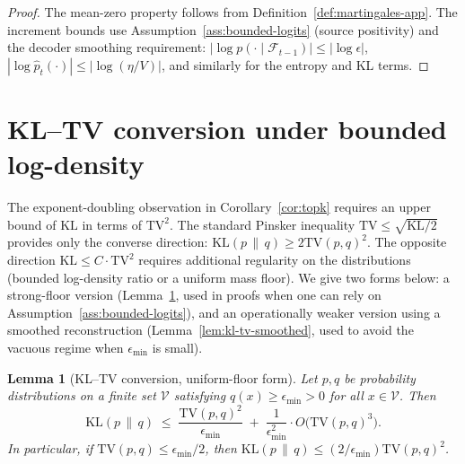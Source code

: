 \documentclass[11pt]{article}
\newcommand{\V}{\mathcal{V}}
\newcommand{\F}{\mathcal{F}}
\newcommand{\phat}{\hat{p}}
\newcommand{\KLs}{\mathrm{KL}}
\newcommand{\TV}{\mathrm{TV}}
\theoremstyle{plain}
\newtheorem{lemma}[theorem]{Lemma}
\theoremstyle{definition}
\theoremstyle{remark}
\begin{document}
\begin{proof}
The mean-zero property follows from Definition~\ref{def:martingales-app}.
The increment bounds use Assumption~\ref{ass:bounded-logits} (source
positivity) and the decoder smoothing requirement:
$|\log p(\cdot \mid \F_{t-1})| \leq |\log \epsilon|$,
$|\log \phat_t(\cdot)| \leq |\log(\eta/V)|$, and similarly for the
entropy and KL terms.
\end{proof}

\section{KL--TV conversion under bounded log-density}\label{app:kltv}

The exponent-doubling observation in Corollary~\ref{cor:topk}
requires an upper bound of $\KLs$ in terms of $\TV^2$. The standard
Pinsker inequality $\TV \leq \sqrt{\KLs/2}$ provides only the
converse direction: $\KLs(p\,\|\,q) \geq 2\TV(p,q)^2$. The opposite
direction $\KLs \leq C \cdot \TV^2$ requires additional regularity
on the distributions (bounded log-density ratio or a uniform mass
floor). We give two forms below: a strong-floor version
(Lemma~\ref{lem:kl-tv-bounded}, used in proofs when one can rely
on Assumption~\ref{ass:bounded-logits}), and an operationally
weaker version using a smoothed reconstruction
(Lemma~\ref{lem:kl-tv-smoothed}, used to avoid the vacuous regime
when $\epsilon_{\min}$ is small).

\begin{lemma}[KL--TV conversion, uniform-floor form]
\label{lem:kl-tv-bounded}
Let $p, q$ be probability distributions on a finite set $\V$
satisfying $q(x) \geq \epsilon_{\min} > 0$ for all $x \in \V$. Then
\[
\KLs(p \,\|\, q) \;\leq\; \frac{\TV(p, q)^2}{\epsilon_{\min}}
\;+\; \frac{1}{\epsilon_{\min}^2} \cdot O\bigl(\TV(p, q)^3\bigr).
\]
In particular, if $\TV(p, q) \leq \epsilon_{\min}/2$, then
$\KLs(p \,\|\, q) \leq (2/\epsilon_{\min}) \TV(p, q)^2$.
\end{lemma}
\end{document}
